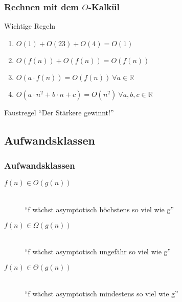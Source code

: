 \begin{frame}
  \frametitle{Rechnen mit dem $O$-Kalkül}
  \begin{block}{Wichtige Regeln}
    \begin{enumerate}
      \item $O(1) + O(23) + O(4) = O(1)$
      \item $O( f(n) ) + O( f(n) ) = O( f(n) )$
      \item $O( a\cdot f(n) ) = O(f(n)) \ \forall a\in\mathbb{R}$
      \item $O( a\cdot n^2+b\cdot n+c ) = O( n^2 ) \ \forall a,b,c\in\mathbb{R}$
    \end{enumerate}
  \end{block}
  \begin{alertblock}{Faustregel}
    "`Der Stärkere gewinnt!"'
  \end{alertblock}
\end{frame}

\subsection{Aufwandsklassen}

\begin{frame}
  \frametitle{Aufwandsklassen}
  \begin{description}
    \item[$f(n) \in O(g(n))$]  \hfill \\
      "`f wächst asymptotisch höchstens so viel wie g"'
    \item[$f(n) \in \Omega(g(n))$] \hfill \\
      "`f wächst asymptotisch ungefähr so viel wie g"'
    \item[$f(n) \in \Theta(g(n))$] \hfill \\
      "`f wächst asymptotisch mindestens so viel wie g"'
  \end{description}
\end{frame}

